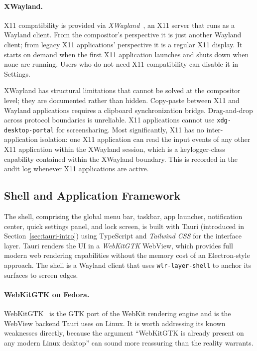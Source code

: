 \paragraph{XWayland.}
X11 compatibility is provided via \emph{XWayland}~\cite{archwiki:xwayland},
an X11 server that runs as a Wayland client. From the compositor's perspective
it is just another Wayland client; from legacy X11 applications' perspective it
is a regular X11 display. It starts on demand when the first X11 application
launches and shuts down when none are running. Users who do not need X11
compatibility can disable it in Settings.

XWayland has structural limitations that cannot be solved at the compositor
level; they are documented rather than hidden. Copy-paste between X11 and
Wayland applications requires a clipboard synchronization bridge.
Drag-and-drop across protocol boundaries is unreliable. X11 applications cannot
use \texttt{xdg-desktop-portal} for screensharing. Most significantly, X11 has
no inter-application isolation: one X11 application can read the input events
of any other X11 application within the XWayland session, which is a
keylogger-class capability contained within the XWayland boundary. This is
recorded in the audit log whenever X11 applications are active.

\subsection{Shell and Application Framework}
\label{sec:shell}

The shell, comprising the global menu bar, taskbar, app launcher, notification center,
quick settings panel, and lock screen, is built with Tauri (introduced in
Section~\ref{sec:tauri-intro}) using TypeScript and \emph{Tailwind CSS} for the
interface layer. Tauri renders the UI in a \emph{WebKitGTK} WebView, which
provides full modern web rendering capabilities without the memory cost of an
Electron-style approach. The shell is a Wayland client that uses
\texttt{wlr-layer-shell} to anchor its surfaces to screen edges.

\paragraph{WebKitGTK on Fedora.}
WebKitGTK~\cite{webkitgtk} is the GTK port of the WebKit rendering engine and
is the WebView backend Tauri uses on Linux. It is worth addressing its known
weaknesses directly, because the argument ``WebKitGTK is already present on any
modern Linux desktop'' can sound more reassuring than the reality warrants.

